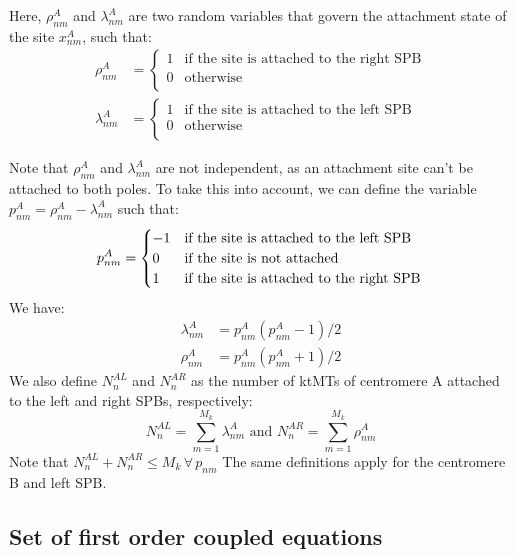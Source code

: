 \documentclass[a4paper,12pt]{article}
\renewcommand{\leq}{\leqslant}
\begin{document}
Here, $\rho_{nm}^A$ and $\lambda_{nm}^A$ are two random variables that govern
the attachment state of the site $x_{nm}^A$, such that:
\begin{align}
  \label{eq:rholambda}
  \rho_{nm}^A &= 
  \begin{cases}
    1 &\text{if the site is attached to the right SPB}\\
    0 &\text{otherwise}\\
  \end{cases}\\
  \lambda_{nm}^A &=
  \begin{cases}
    1 &\text{if the site is attached to the left SPB}\\
    0 &\text{otherwise}\\
  \end{cases}
\end{align}

Note that $\rho_{nm}^A$ and $\lambda_{nm}^A$ are not independent, as
an attachment site can't be attached to both poles. To take this into
account, we can define the variable $p_{nm}^A = \rho_{nm}^A -
\lambda_{nm}^A$ such that:
\begin{equation}
  \label{eq:rholambda}
  p_{nm}^A = 
  \begin{cases}
    - 1 &\text{if the site is attached to the left SPB}\\
    0 &\text{if the site is not attached}\\
    1 &\text{if the site is attached to the right SPB}\\
  \end{cases}\\
\end{equation}
We have:
\begin{align}
  \lambda_{nm}^A &= p_{nm}^A\left(p_{nm}^A - 1\right)/2\\
  \rho_{nm}^A &= p_{nm}^A\left(p_{nm}^A + 1\right)/2
\end{align}
We also define $N_n^{AL}$ and $N_n^{AR}$ as the number of ktMTs of
centromere A attached to the left and right SPBs, respectively:
\begin{equation}
  \label{eq:NAL}
  N_n^{AL} = \sum_{m = 1}^{M_k}\lambda_{nm}^A \mbox{ and }%
  N_n^{AR} = \sum_{m = 1}^{M_k}\rho_{nm}^A 
\end{equation}
Note that $N_n^{AL} + N_n^{AR} \leq M_k\, \forall\, p_{nm} $
The same definitions apply for the centromere B and left SPB.

\subsection{Set of first order coupled equations}
\end{document}
